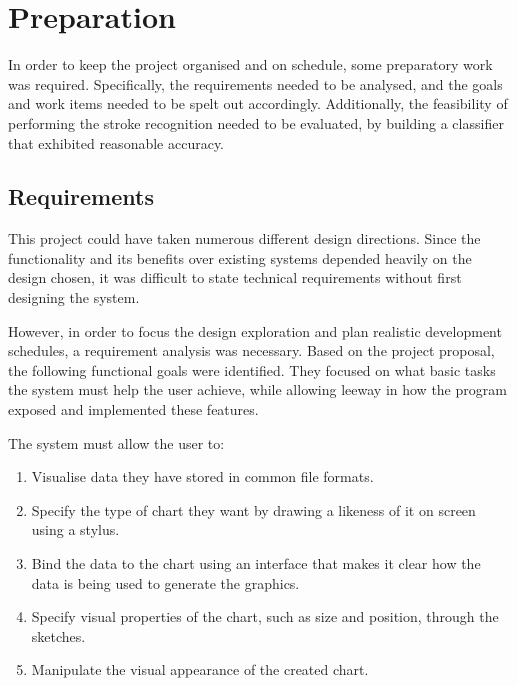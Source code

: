 \chapter{Preparation}
In order to keep the project organised and on schedule, some preparatory work was required. Specifically, the requirements needed to be analysed, and the goals and work items needed to be spelt out accordingly. Additionally, the feasibility of performing the stroke recognition needed to be evaluated, by building a classifier that exhibited reasonable accuracy.

	\section{Requirements}
	\label{sec:Requirements}
	This project could have taken numerous different design directions. Since the functionality and its benefits over existing systems depended heavily on the design chosen, it was difficult to state technical requirements without first designing the system.
	
	However, in order to focus the design exploration and plan realistic development schedules, a requirement analysis was necessary. Based on the project proposal, the following functional goals were identified. They focused on what basic tasks the system must help the user achieve, while allowing leeway in how the program exposed and implemented these features.
	
	The system must allow the user to:
	\begin{enumerate}[label=\bfseries Core \arabic*]
		\item Visualise data they have stored in common file formats.
		\item Specify the type of chart they want by drawing a likeness of it on screen using a stylus.
		\item Bind the data to the chart using an interface that makes it clear how the data is being used to generate the graphics.
		\item Specify visual properties of the chart, such as size and position, through the sketches.
		\item Manipulate the visual appearance of the created chart.
	\end{enumerate}
	

